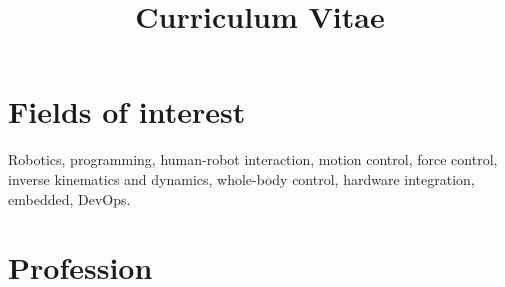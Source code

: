 \documentclass[12pt,a4paper,sans]{moderncv} %
\title{Curriculum Vitae}
\begin{document}
\makecvtitle %




\section{Fields of interest}
Robotics, programming, human-robot interaction, motion control, force control, inverse kinematics and dynamics, whole-body control, hardware integration, embedded, DevOps.

\section{Profession}
\end{document}
